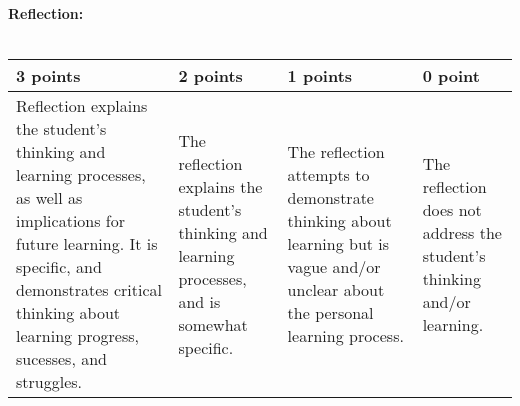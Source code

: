 \documentclass[12pt,landscape]{article}
\begin{document}
\bigskip
\bigskip
{\large \textbf{ Reflection:}}\\~\\
{\renewcommand{\arraystretch}{2}
\begin{tabular}{|p{5cm}|p{5cm}|p{5cm}|p{5cm}|}
\hline
 {\bf 3 points} & {\bf 2 points} & {\bf 1 points} & {\bf 0 point} \\
\hline

Reflection explains the student's thinking and learning processes, as well as implications for future learning. It is specific, and demonstrates critical thinking about learning progress, sucesses, and struggles.& 
The reflection explains the student's thinking and learning processes, and is somewhat specific.&
The reflection attempts to demonstrate thinking about learning but is vague and/or unclear about the personal learning process.&
The reflection does not address the student's thinking and/or learning.\\
\hline
 \end{tabular}
}
\end{document}
